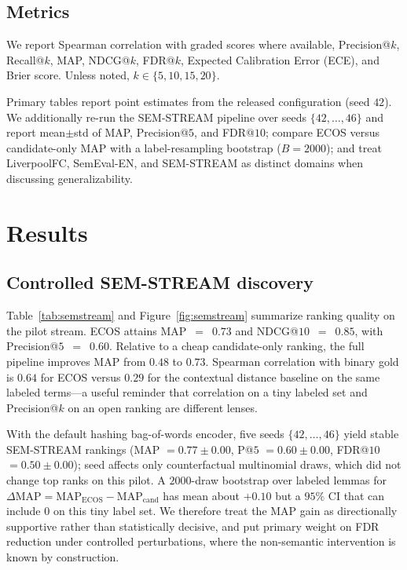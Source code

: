 \documentclass{llncs}
\newcommand{\addrev}[1]{{\color{blue}#1}}
\begin{document}
\subsection{Metrics}
We report Spearman correlation with graded scores where available, Precision@$k$, Recall@$k$, MAP, NDCG@$k$, FDR@$k$, Expected Calibration Error (ECE), and Brier score.
Unless noted, $k\in\{5,10,15,20\}$.


\addrev{Primary tables report point estimates from the released configuration (seed $42$).
We additionally re-run the SEM-STREAM pipeline over seeds $\{42,\ldots,46\}$ and report mean$\pm$std of MAP, Precision@$5$, and FDR@$10$;
compare ECOS versus candidate-only MAP with a label-resampling bootstrap ($B{=}2000$);
and treat LiverpoolFC, SemEval-EN, and SEM-STREAM as distinct domains when discussing generalizability.}

\section{Results}
\label{sec:results}

\subsection{Controlled SEM-STREAM discovery}
Table~\ref{tab:semstream} and Figure~\ref{fig:semstream} summarize ranking quality on the pilot stream.
ECOS attains MAP~$=$~$0.73$ and NDCG@$10$~$=$~$0.85$, with Precision@$5$~$=$~$0.60$.
Relative to a cheap candidate-only ranking, the full pipeline improves MAP from $0.48$ to $0.73$.
Spearman correlation with binary gold is $0.64$ for ECOS versus $0.29$ for the contextual distance baseline on the same labeled terms---a useful reminder that correlation on a tiny labeled set and Precision@$k$ on an open ranking are different lenses.


\addrev{With the default hashing bag-of-words encoder, five seeds $\{42,\ldots,46\}$ yield stable SEM-STREAM rankings (MAP $=0.77\pm 0.00$, P@$5$ $=0.60\pm 0.00$, FDR@$10$ $=0.50\pm 0.00$); seed affects only counterfactual multinomial draws, which did not change top ranks on this pilot.
A $2000$-draw bootstrap over labeled lemmas for $\Delta\mathrm{MAP}=\mathrm{MAP}_{\mathrm{ECOS}}-\mathrm{MAP}_{\mathrm{cand}}$ has mean about $+0.10$ but a $95\%$ CI that can include $0$ on this tiny label set.
We therefore treat the MAP gain as directionally supportive rather than statistically decisive, and put primary weight on FDR reduction under controlled perturbations, where the non-semantic intervention is known by construction.}
\end{document}
